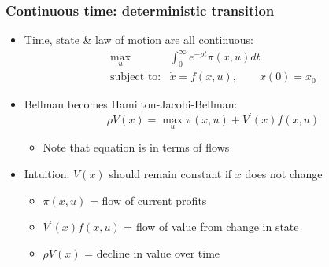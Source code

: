 \documentclass[bigger,handout]{beamer}
\newenvironment{stepitemize}{\begin{itemize}[<+->]}{\end{itemize} }
\begin{document}
\begin{frame}%
\frametitle{Continuous time: deterministic transition}

\begin{stepitemize}
\item Time, state \& law of motion are all continuous:%
\begin{equation*}
\begin{array}{rl}
\max_{u} & \int_{0}^{\infty }e^{-\rho t}\pi \left( x,u\right) dt \\
\text{subject to:} & \dot{x}=f(x,u),\qquad x(0)=x_{0}%
\end{array}%
\end{equation*}

\item Bellman becomes Hamilton-Jacobi-Bellman:%
\begin{equation*}
\rho V(x)=\max_{u}\pi \left( x,u\right) +V^{\prime }(x)f(x,u)
\end{equation*}

\begin{itemize}
\item Note that equation is in terms of flows
\end{itemize}

\item Intuition: $V(x)$ should remain constant if $x$ does not change

\begin{stepitemize}
\item $\pi \left( x,u\right) $ = flow of current profits

\item $V^{\prime }(x)f(x,u)$ = flow of value from change in state

\item $\rho V(x)$ = decline in value over time
\end{stepitemize}
\end{stepitemize}

\end{frame}%
\end{document}
